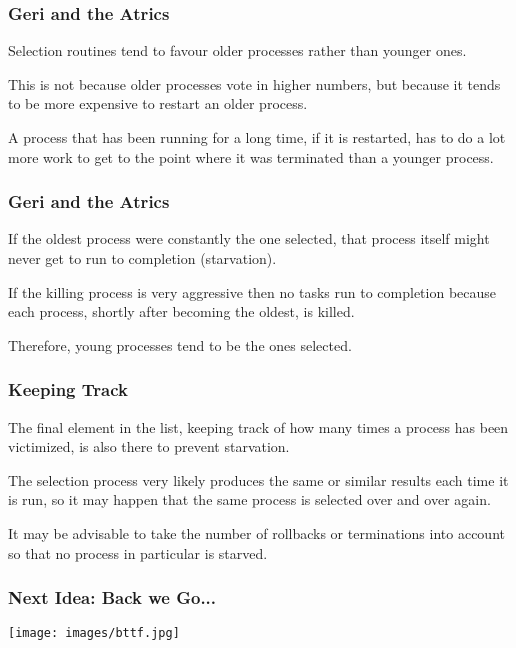 \begin{frame}
	\frametitle{Geri and the Atrics}

	Selection routines tend to favour older processes rather than younger ones.

	This is not because older processes vote in higher numbers, but because it tends to be more expensive to restart an older process.

	A process that has been running for a long time, if it is restarted, has to do a lot more work to get to the point where it was terminated than a younger process.

\end{frame}

\begin{frame}
	\frametitle{Geri and the Atrics}

	If the oldest process were constantly the one selected, that process itself might never get to run to completion (starvation).

	If the killing process is very aggressive then no tasks run to completion because each process, shortly after becoming the oldest, is killed.


	Therefore, young processes tend to be the ones selected.

\end{frame}

\begin{frame}
	\frametitle{Keeping Track}

	The final element in the list, keeping track of how many times a process has been victimized, is also there to prevent starvation.

	The selection process very likely produces the same or similar results each time it is run, so it may happen that the same process is selected over and over again.

	It may be advisable to take the number of rollbacks or terminations into account so that no process in particular is starved.

\end{frame}


\begin{frame}
	\frametitle{Next Idea: Back we Go...}

	\begin{center}
		\texttt{[image: images/bttf.jpg]}
	\end{center}

\end{frame}


